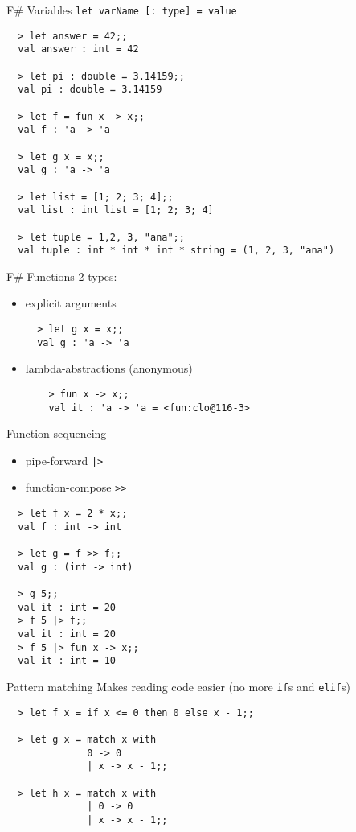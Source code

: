 \documentclass{beamer}
\begin{document}
\begin{frame}[fragile]{F\# Variables}
  \texttt{let varName [: type] = value}
  \tiny{
  \begin{verbatim}
  > let answer = 42;;
  val answer : int = 42

  > let pi : double = 3.14159;;
  val pi : double = 3.14159

  > let f = fun x -> x;;
  val f : 'a -> 'a

  > let g x = x;;
  val g : 'a -> 'a

  > let list = [1; 2; 3; 4];;
  val list : int list = [1; 2; 3; 4]

  > let tuple = 1,2, 3, "ana";;
  val tuple : int * int * int * string = (1, 2, 3, "ana")
  \end{verbatim}
  }
\end{frame}

\begin{frame}[fragile]{F\# Functions}
  2 types:
  \begin{itemize}
    \item explicit arguments
    \begin{verbatim}
  > let g x = x;;
  val g : 'a -> 'a
    \end{verbatim}
    \item lambda-abstractions (anonymous)
    \begin{verbatim}
    > fun x -> x;;
    val it : 'a -> 'a = <fun:clo@116-3>
    \end{verbatim}
  \end{itemize}
\end{frame}

\begin{frame}[fragile]{Function sequencing}
  \begin{itemize}
    \item pipe-forward \texttt{|>}
    \item function-compose \texttt{>>}
  \end{itemize}
  \begin{verbatim}
  > let f x = 2 * x;;
  val f : int -> int

  > let g = f >> f;;
  val g : (int -> int)

  > g 5;;
  val it : int = 20
  > f 5 |> f;;
  val it : int = 20
  > f 5 |> fun x -> x;;
  val it : int = 10
  \end{verbatim}
\end{frame}

\begin{frame}[fragile]{Pattern matching}
  Makes reading code easier (no more \texttt{if}s and \texttt{elif}s)
  \begin{verbatim}
  > let f x = if x <= 0 then 0 else x - 1;;

  > let g x = match x with
              0 -> 0
              | x -> x - 1;;

  > let h x = match x with
              | 0 -> 0
              | x -> x - 1;;
  \end{verbatim}
\end{frame}
\end{document}
